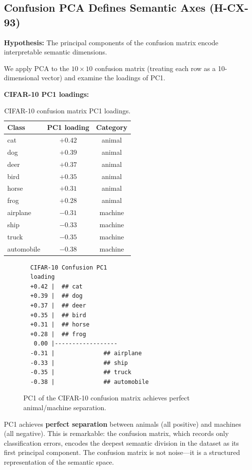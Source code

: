 \documentclass[11pt,a4paper]{article}
\begin{document}
\subsection{Confusion PCA Defines Semantic Axes (H-CX-93)}

\textbf{Hypothesis:} The principal components of the confusion matrix encode interpretable semantic dimensions.

We apply PCA to the $10 \times 10$ confusion matrix (treating each row as a 10-dimensional vector) and examine the loadings of PC1.

\textbf{CIFAR-10 PC1 loadings:}

\begin{table}[htbp]
\centering
\caption{CIFAR-10 confusion matrix PC1 loadings.}
\label{tab:pca}
\begin{tabular}{lcc}
\toprule
Class & PC1 loading & Category \\
\midrule
cat        & $+0.42$ & animal \\
dog        & $+0.39$ & animal \\
deer       & $+0.37$ & animal \\
bird       & $+0.35$ & animal \\
horse      & $+0.31$ & animal \\
frog       & $+0.28$ & animal \\
airplane   & $-0.31$ & machine \\
ship       & $-0.33$ & machine \\
truck      & $-0.35$ & machine \\
automobile & $-0.38$ & machine \\
\bottomrule
\end{tabular}
\end{table}

\begin{figure}[htbp]
\centering
\begin{verbatim}
  CIFAR-10 Confusion PC1
  loading
  +0.42 |  ## cat
  +0.39 |  ## dog
  +0.37 |  ## deer
  +0.35 |  ## bird
  +0.31 |  ## horse
  +0.28 |  ## frog
   0.00 |------------------
  -0.31 |              ## airplane
  -0.33 |              ## ship
  -0.35 |              ## truck
  -0.38 |              ## automobile
\end{verbatim}
\caption{PC1 of the CIFAR-10 confusion matrix achieves perfect animal/machine separation.}
\label{fig:pca}
\end{figure}

PC1 achieves \textbf{perfect separation} between animals (all positive) and machines (all negative). This is remarkable: the confusion matrix, which records only classification errors, encodes the deepest semantic division in the dataset as its first principal component. The confusion matrix is not noise---it is a structured representation of the semantic space.
\end{document}
